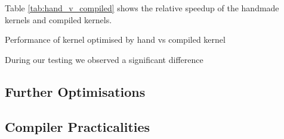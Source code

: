 Table \ref{tab:hand_v_compiled} shows the relative speedup of the handmade kernels and compiled kernels.

\begin{table}
    \centering
 
\caption{Performance of kernel optimised by hand vs compiled kernel}\label{tab:hand_v_compiled}
\end{table}

During our testing we observed a significant difference

\subsection{Further Optimisations}

\subsection{Compiler Practicalities} \label{sec:practical}
